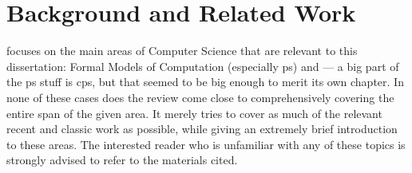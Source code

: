 \chapter{Background and Related Work}
 focuses on the main areas of Computer Science that are relevant to this dissertation:  Formal Models of Computation (especially \gls{ps}) and  --- a big part of the \gls{ps} stuff is \gls{cps}, but that seemed to be big enough to merit its own chapter.  In none of these cases does the review come close to comprehensively covering the entire span of the given area.  It merely tries to cover as much of the relevant recent and classic work as possible, while giving an extremely brief introduction to these areas.  The interested reader who is unfamiliar with any of these topics is strongly advised to refer to the materials cited.




% 
